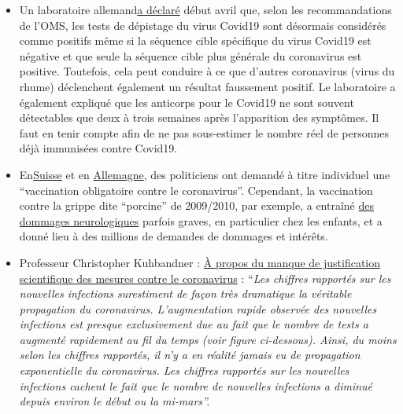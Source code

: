 \begin{itemize}
{  étude de l'OMS a trouvé ``peu ou pas de preuves scientifiques}'' de
  l'efficacité de mesures telles que la ``distanciation sociale'', les
  restrictions de voyage et le verrouillage.
\item
  Un laboratoire
  allemand\href{http://www.labor-augsburg-mvz.de/de/aktuelles/coronavirus}{a
  déclaré} début avril que, selon les recommandations de l'OMS, les
  tests de dépistage du virus Covid19 sont désormais considérés comme
  positifs même si la séquence cible spécifique du virus Covid19 est
  négative et que seule la séquence cible plus générale du coronavirus
  est positive. Toutefois, cela peut conduire à ce que d'autres
  coronavirus (virus du rhume) déclenchent également un résultat
  faussement positif. Le laboratoire a également expliqué que les
  anticorps pour le Covid19 ne sont souvent détectables que deux à trois
  semaines après l'apparition des symptômes. Il faut en tenir compte
  afin de ne pas sous-estimer le nombre réel de personnes déjà
  immunisées contre Covid19.
\item
  En\href{https://www.20min.ch/schweiz/news/story/-rzte-und-Politiker-fordern-Corona-Impfzwang-20853917}{Suisse}
  et en
  \href{https://www.faz.net/agenturmeldungen/dpa/soeder-waere-fuer-deutschlandweite-impfpflicht-gegen-corona-16738369.html}{Allemagne},
  des politiciens ont demandé à titre individuel une ``vaccination
  obligatoire contre le coronavirus''. Cependant, la vaccination contre
  la grippe dite ``porcine'' de 2009/2010, par exemple, a entraîné
  \href{https://www.ibtimes.co.uk/brain-damaged-uk-victims-swine-flu-vaccine-get-60-million-compensation-1438572}{des
  dommages neurologiques} parfois graves, en particulier chez les
  enfants, et a donné lieu à des millions de demandes de dommages et
  intérêts.
\item
  Professeur Christopher Kuhbandner :
  \href{https://www.heise.de/tp/features/Von-der-fehlenden-wissenschaftlichen-Begruendung-der-Corona-Massnahmen-4709563.html?seite=all}{À
  propos du manque de justification scientifique des mesures contre le
  coronavirus} : ``\emph{Les chiffres rapportés sur les nouvelles
  infections surestiment de façon très dramatique la véritable
  propagation du coronavirus. L'augmentation rapide observée des
  nouvelles infections est presque exclusivement due au fait que le
  nombre de tests a augmenté rapidement au fil du temps (voir figure
  ci-dessous). Ainsi, du moins selon les chiffres rapportés, il n'y a en
  réalité jamais eu de propagation exponentielle du coronavirus. Les
  chiffres rapportés sur les nouvelles infections cachent le fait que le
  nombre de nouvelles infections a diminué depuis environ le début ou la
  mi-mars''.}
\end{itemize}

